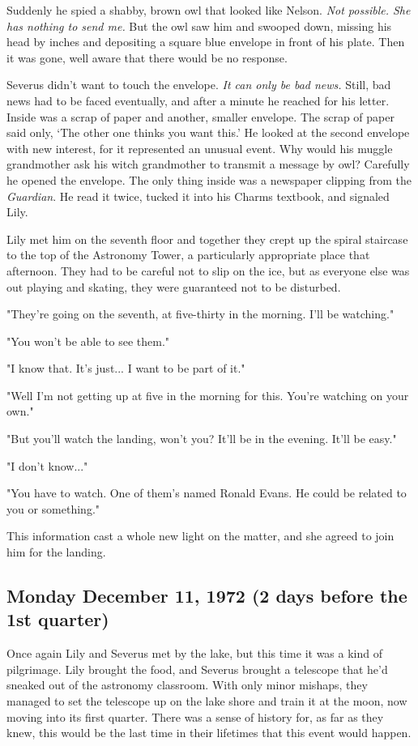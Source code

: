 \documentclass[a4paper,11pt]{article}
\begin{document}
Suddenly he spied a shabby, brown owl that looked like Nelson. \emph{Not possible. She has nothing to send me.} But the owl saw him and swooped down, missing his head by inches and depositing a square blue envelope in front of his plate. Then it was gone, well aware that there would be no response.

Severus didn't want to touch the envelope. \emph{It can only be bad news.} Still, bad news had to be faced eventually, and after a minute he reached for his letter. Inside was a scrap of paper and another, smaller envelope. The scrap of paper said only, `The other one thinks you want this.' He looked at the second envelope with new interest, for it represented an unusual event. Why would his muggle grandmother ask his witch grandmother to transmit a message by owl? Carefully he opened the envelope. The only thing inside was a newspaper clipping from the \emph{Guardian}. He read it twice, tucked it into his Charms textbook, and signaled Lily.

Lily met him on the seventh floor and together they crept up the spiral staircase to the top of the Astronomy Tower, a particularly appropriate place that afternoon. They had to be careful not to slip on the ice, but as everyone else was out playing and skating, they were guaranteed not to be disturbed.

"They're going on the seventh, at five-thirty in the morning. I'll be watching."

"You won't be able to see them."

"I know that. It's just... I want to be part of it."

"Well I'm not getting up at five in the morning for this. You're watching on your own."

"But you'll watch the landing, won't you? It'll be in the evening. It'll be easy."

"I don't know..."

"You have to watch. One of them's named Ronald Evans. He could be related to you or something."

This information cast a whole new light on the matter, and she agreed to join him for the landing.

\subsection{Monday December 11, 1972 (2 days before the 1st quarter)}

Once again Lily and Severus met by the lake, but this time it was a kind of pilgrimage. Lily brought the food, and Severus brought a telescope that he'd sneaked out of the astronomy classroom. With only minor mishaps, they managed to set the telescope up on the lake shore and train it at the moon, now moving into its first quarter. There was a sense of history for, as far as they knew, this would be the last time in their lifetimes that this event would happen.
\end{document}
